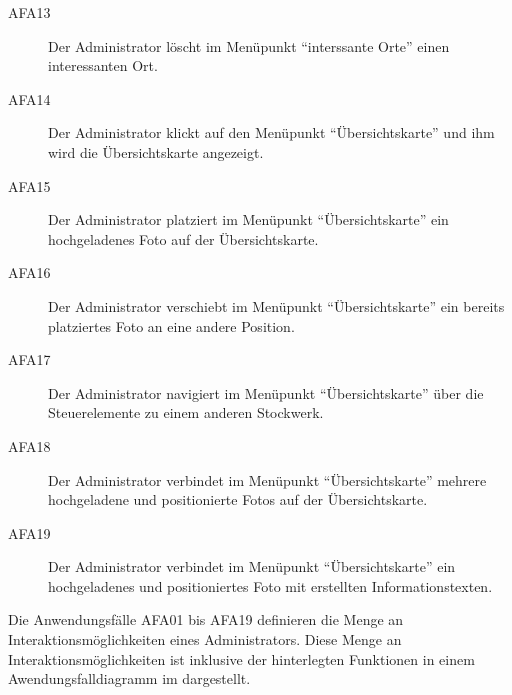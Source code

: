 \begin{description}
  \item[AFA13] Der Administrator löscht im Menüpunkt "`interssante Orte"' einen
  interessanten Ort.
  \item[AFA14] Der Administrator klickt auf den Menüpunkt "`Übersichtskarte"'
  und ihm wird die Übersichtskarte angezeigt.
  \item[AFA15] Der Administrator platziert im Menüpunkt "`Übersichtskarte"' ein
  hochgeladenes Foto auf der Übersichtskarte.
  \item[AFA16] Der Administrator verschiebt im Menüpunkt "`Übersichtskarte"' ein
  bereits platziertes Foto an eine andere Position.
  \item[AFA17] Der Administrator navigiert im Menüpunkt "`Übersichtskarte"' über
  die Steuerelemente zu einem anderen Stockwerk.
  \item[AFA18] Der Administrator verbindet im Menüpunkt "`Übersichtskarte"'
  mehrere hochgeladene und positionierte Fotos auf der Übersichtskarte.
  \item[AFA19] Der Administrator verbindet im Menüpunkt "`Übersichtskarte"' ein
  hochgeladenes und positioniertes Foto mit erstellten Informationstexten.
\end{description}

Die Anwendungsfälle AFA01 bis AFA19 definieren die Menge an
Interaktionsmöglichkeiten eines Administrators. Diese Menge an
Interaktionsmöglichkeiten ist inklusive der hinterlegten Funktionen in einem
Awendungsfalldiagramm im  dargestellt.

